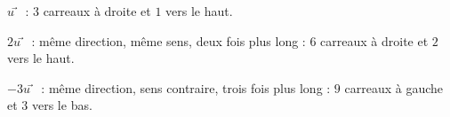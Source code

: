 \documentclass[11pt,a4paper]{article}
\newcommand{\quadrillage}[4]{\draw[grille,step=1] (#1,#2) grid (#3,#4);}
\def\vec#1{#1⃗}}%
\begin{document}
\begin{exemplebox}[Exemple]
\begin{center}
\end{center}
$\vec{u}$ : $3$ carreaux à droite et $1$ vers le haut.

$2\vec{u}$ : même direction, même sens, deux fois plus long : $6$ carreaux à droite et $2$
vers le haut.

$-3\vec{u}$ : même direction, sens contraire, trois fois plus long : $9$ carreaux à gauche
et $3$ vers le bas.
\end{exemplebox}
\end{document}
